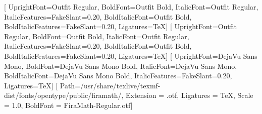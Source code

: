 \usepackage{fontspec}
\usepackage{unicode-math}
\setmainfont{Outfit}[
  UprightFont={Outfit Regular}, BoldFont={Outfit Bold},
  ItalicFont={Outfit Regular}, ItalicFeatures={FakeSlant=0.20},
  BoldItalicFont={Outfit Bold}, BoldItalicFeatures={FakeSlant=0.20},
  Ligatures={TeX}]
\setsansfont{Outfit}[
  UprightFont={Outfit Regular}, BoldFont={Outfit Bold},
  ItalicFont={Outfit Regular}, ItalicFeatures={FakeSlant=0.20},
  BoldItalicFont={Outfit Bold}, BoldItalicFeatures={FakeSlant=0.20},
  Ligatures={TeX}]
\setmonofont{DejaVu Sans Mono}[
  UprightFont={DejaVu Sans Mono}, BoldFont={DejaVu Sans Mono Bold},
  ItalicFont={DejaVu Sans Mono}, BoldItalicFont={DejaVu Sans Mono Bold},
  ItalicFeatures={FakeSlant=0.20}, Ligatures={TeX}]
[
  Path=/usr/share/texlive/texmf-dist/fonts/opentype/public/firamath/,
  Extension = .otf, Ligatures = {TeX}, Scale = 1.0,
  BoldFont = FiraMath-Regular.otf]

\usepackage{textcomp}
\usepackage{amsmath,bm}
\usepackage{ragged2e}
\usepackage{fvextra}
\usepackage[protrusion=false]{microtype}
\usepackage{graphicx}
\usepackage{tikz}
\usepackage{pgfplots}
\usepackage{booktabs}
\usepackage{tabularx}
\usepackage{longtable}
\usepackage{array}
\usepackage{multirow}
\usepackage{makecell}
\usepackage{enumitem}
\usepackage{float}
\usepackage{caption}
\usepackage{tcolorbox}
\usepackage{fancyhdr}
\usepackage{titlesec}
\usepackage{tocloft}
\usepackage{pdfpages}
\usepackage{eso-pic}
\usepackage{url}
\usepackage{seqsplit}
\newcommand{\code}[1]{\texttt{\seqsplit{#1}}}
\usepackage{hyperref}
\usepackage{makeidx}
\usepackage[english]{babel}

